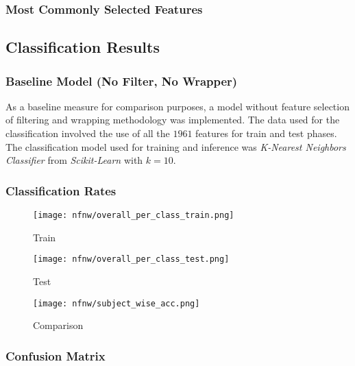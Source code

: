 \documentclass[12pt,twoside,a4paper]{article}
\begin{document}
\subsubsection{Most Commonly Selected Features}

\subsection{Classification Results}

\subsubsection{Baseline Model (No Filter, No Wrapper)}
As a baseline measure for comparison purposes, a model without feature selection of filtering and wrapping methodology was implemented. The data used for the classification involved the use of all the $1961$ features for train and test phases. The classification model used for training and inference was \textit{K-Nearest Neighbors Classifier} from \textit{Scikit-Learn} with $k=10$.

\subsubsection*{Classification Rates}

\begin{figure}[H]
    \centering
    \texttt{[image: nfnw/overall\_per\_class\_train.png]}
    \caption{Train}
    \label{fig: NFW1}
\end{figure}

\begin{figure}[H]
    \centering
    \texttt{[image: nfnw/overall\_per\_class\_test.png]}
    \caption{Test}
    \label{fig: NFW2}
\end{figure}

\begin{figure}[H]
    \centering
    \texttt{[image: nfnw/subject\_wise\_acc.png]}
    \caption{Comparison}
    \label{fig: NFW3}
\end{figure}

\subsubsection*{Confusion Matrix}
\end{document}
